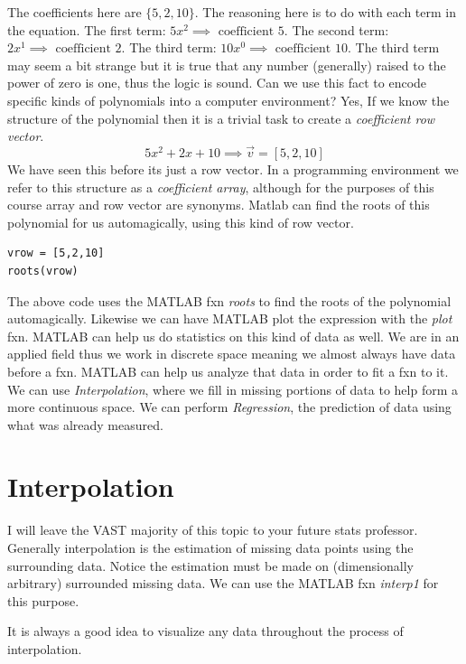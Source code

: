 \documentclass[12pt]{article}
\begin{document}
		The coefficients here are $\{5, 2, 10\}$.
		The reasoning here is to do with each term in the equation.
		The first term: $5 x^2 \implies \text{ coefficient } 5$.
		The second term: $2 x^1 \implies \text{ coefficient } 2$.
		The third term: $10 x^0 \implies \text{ coefficient } 10$.
		The third term may seem a bit strange but it is true that any number (generally) raised to the power of zero is one,
			thus the logic is sound.
		Can we use this fact to encode specific kinds of polynomials into a computer environment?
		Yes,
			If we know the structure of the polynomial then it is a trivial task to create a \textit{coefficient row vector}.
		\begin{equation}
			5x^2 + 2x + 10 \implies \vec{v} = [5, 2, 10]
		\end{equation}
		We have seen this before its just a row vector.
		In a programming environment we refer to this structure as a \textit{coefficient array},
			although for the purposes of this course array and row vector are synonyms.
		Matlab can find the roots of this polynomial for us automagically,
			using this kind of row vector.
		\begin{lstlisting}[style=pseudocode]
vrow = [5,2,10]
roots(vrow)
		\end{lstlisting}
		The above code uses the MATLAB fxn \textit{roots} to find the roots of the polynomial automagically.
		Likewise we can have MATLAB plot the expression with the \textit{plot} fxn.
		MATLAB can help us do statistics on this kind of data as well.
		We are in an applied field thus we work in discrete space meaning we almost always have data before a fxn.
		MATLAB can help us analyze that data in order to fit a fxn to it.
		We can use \textit{Interpolation},
			where we fill in missing portions of data to help form a more continuous space.
		We can perform \textit{Regression},
			the prediction of data using what was already measured.

	\section{Interpolation}
		I will leave the VAST majority of this topic to your future stats professor.
		Generally interpolation is the estimation of missing data points using the surrounding data.
		Notice the estimation must be made on (dimensionally arbitrary) surrounded missing data.
		We can use the MATLAB fxn \textit{interp1} for this purpose.

		It is always a good idea to visualize any data throughout the process of interpolation.
		
\end{document}
